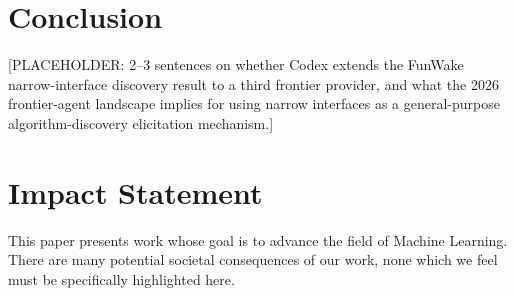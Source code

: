 \documentclass{article}
\begin{document}
\section{Conclusion}

[PLACEHOLDER: 2--3 sentences on whether Codex extends the FunWake
narrow-interface discovery result to a third frontier provider, and
what the 2026 frontier-agent landscape implies for using narrow
interfaces as a general-purpose algorithm-discovery elicitation
mechanism.]

\section*{Impact Statement}

This paper presents work whose goal is to advance the field of
Machine Learning. There are many potential societal consequences of
our work, none which we feel must be specifically highlighted here.



\end{document}
